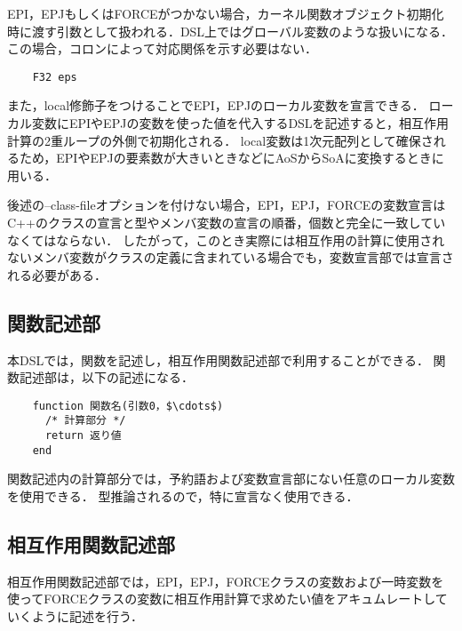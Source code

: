 \documentclass{article}
\begin{document}
EPI，EPJもしくはFORCEがつかない場合，カーネル関数オブジェクト初期化時に渡す引数として扱われる．DSL上ではグローバル変数のような扱いになる．
この場合，コロンによって対応関係を示す必要はない．
\begin{verbatim}
	F32 eps
\end{verbatim}

また，local修飾子をつけることでEPI，EPJのローカル変数を宣言できる．
ローカル変数にEPIやEPJの変数を使った値を代入するDSLを記述すると，相互作用計算の2重ループの外側で初期化される．
local変数は1次元配列として確保されるため，EPIやEPJの要素数が大きいときなどにAoSからSoAに変換するときに用いる．

後述の--class-fileオプションを付けない場合，EPI，EPJ，FORCEの変数宣言はC++のクラスの宣言と型やメンバ変数の宣言の順番，個数と完全に一致していなくてはならない．
したがって，このとき実際には相互作用の計算に使用されないメンバ変数がクラスの定義に含まれている場合でも，変数宣言部では宣言される必要がある．

\subsection{関数記述部}
本DSLでは，関数を記述し，相互作用関数記述部で利用することができる．
関数記述部は，以下の記述になる．
\begin{verbatim}
	function 関数名(引数0，$\cdots$)
	  /* 計算部分 */
	  return 返り値
	end
\end{verbatim}

関数記述内の計算部分では，予約語および変数宣言部にない任意のローカル変数を使用できる．
型推論されるので，特に宣言なく使用できる．

\subsection{相互作用関数記述部} \label{subsec:kernel}
相互作用関数記述部では，EPI，EPJ，FORCEクラスの変数および一時変数を使ってFORCEクラスの変数に相互作用計算で求めたい値をアキュムレートしていくように記述を行う．
\end{document}

